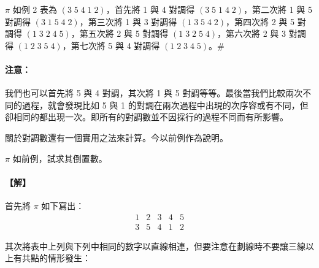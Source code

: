 \begin{example}\label{ex:b6s-1-14}
$\pi$ 如例 2 表為 $(3 \; 5 \; 4 \; 1 \; 2)$，首先將 1 與 4 對調得 $(3 \; 5 \; 1 \; 4 \; 2)$，第二次將 1 與 5 對調得 $(3 \; 1 \; 5 \; 4 \; 2)$，第三次將 1 與 3 對調得 $(1 \; 3 \; 5 \; 4 \; 2)$，第四次將 2 與 5 對調得 $(1 \; 3 \; 2 \; 4 \; 5)$，第五次將 2 與 5 對調得 $(1 \; 3 \; 2 \; 5 \; 4)$，第六次將 2 與 3 對調得 $(1 \; 2 \; 3 \; 5 \; 4)$，第七次將 5 與 4 對調得 $(1 \; 2 \; 3 \; 4 \; 5)$。\hfill$\#$
\end{example}

\paragraph{注意：}我們也可以首先將 5 與 4 對調，其次將 1 與 5 對調等等。最後當我們比較兩次不同的過程，就會發現比如 5 與 1 的對調在兩次過程中出現的次序容或有不同，但卻相同的都出現一次。即所有的對調數並不因採行的過程不同而有所影響。

關於對調數還有一個實用之法來計算。今以前例作為說明。

\begin{discussion}\label{disc:b6s-1-2}
$\pi$ 如前例，試求其倒置數。
\end{discussion}

\paragraph{【解】}
首先將 $\pi$ 如下寫出：
\[ \begin{matrix} 1 & 2 & 3 & 4 & 5 \\ 3 & 5 & 4 & 1 & 2 \end{matrix} \]

其次將表中上列與下列中相同的數字以直線相連，但要注意在劃線時不要讓三線以上有共點的情形發生：

\begin{figure}[H]
\centering
{}
\end{figure}

